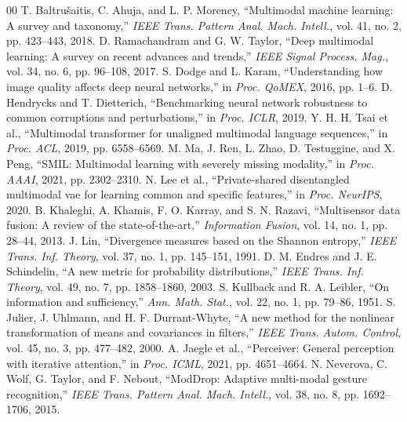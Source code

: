 \documentclass[conference]{IEEEtran}
\begin{document}
\begin{thebibliography}{00}
\small
{} T. Baltru{\v{s}}aitis, C. Ahuja, and L. P. Morency, ``Multimodal machine learning: A survey and taxonomy,'' \emph{IEEE Trans. Pattern Anal. Mach. Intell.}, vol. 41, no. 2, pp. 423--443, 2018.
 D. Ramachandram and G. W. Taylor, ``Deep multimodal learning: A survey on recent advances and trends,'' \emph{IEEE Signal Process. Mag.}, vol. 34, no. 6, pp. 96--108, 2017.
 S. Dodge and L. Karam, ``Understanding how image quality affects deep neural networks,'' in \emph{Proc. QoMEX}, 2016, pp. 1--6.
 D. Hendrycks and T. Dietterich, ``Benchmarking neural network robustness to common corruptions and perturbations,'' in \emph{Proc. ICLR}, 2019.
 Y. H. H. Tsai et al., ``Multimodal transformer for unaligned multimodal language sequences,'' in \emph{Proc. ACL}, 2019, pp. 6558--6569.
 M. Ma, J. Ren, L. Zhao, D. Testuggine, and X. Peng, ``SMIL: Multimodal learning with severely missing modality,'' in \emph{Proc. AAAI}, 2021, pp. 2302--2310.
 N. Lee et al., ``Private-shared disentangled multimodal vae for learning common and specific features,'' in \emph{Proc. NeurIPS}, 2020.
 B. Khaleghi, A. Khamis, F. O. Karray, and S. N. Razavi, ``Multisensor data fusion: A review of the state-of-the-art,'' \emph{Information Fusion}, vol. 14, no. 1, pp. 28--44, 2013.
 J. Lin, ``Divergence measures based on the Shannon entropy,'' \emph{IEEE Trans. Inf. Theory}, vol. 37, no. 1, pp. 145--151, 1991.
 D. M. Endres and J. E. Schindelin, ``A new metric for probability distributions,'' \emph{IEEE Trans. Inf. Theory}, vol. 49, no. 7, pp. 1858--1860, 2003.
 S. Kullback and R. A. Leibler, ``On information and sufficiency,'' \emph{Ann. Math. Stat.}, vol. 22, no. 1, pp. 79--86, 1951.
 S. Julier, J. Uhlmann, and H. F. Durrant-Whyte, ``A new method for the nonlinear transformation of means and covariances in filters,'' \emph{IEEE Trans. Autom. Control}, vol. 45, no. 3, pp. 477--482, 2000.
 A. Jaegle et al., ``Perceiver: General perception with iterative attention,'' in \emph{Proc. ICML}, 2021, pp. 4651--4664.
 N. Neverova, C. Wolf, G. Taylor, and F. Nebout, ``ModDrop: Adaptive multi-modal gesture recognition,'' \emph{IEEE Trans. Pattern Anal. Mach. Intell.}, vol. 38, no. 8, pp. 1692--1706, 2015.

\end{thebibliography}
\end{document}
